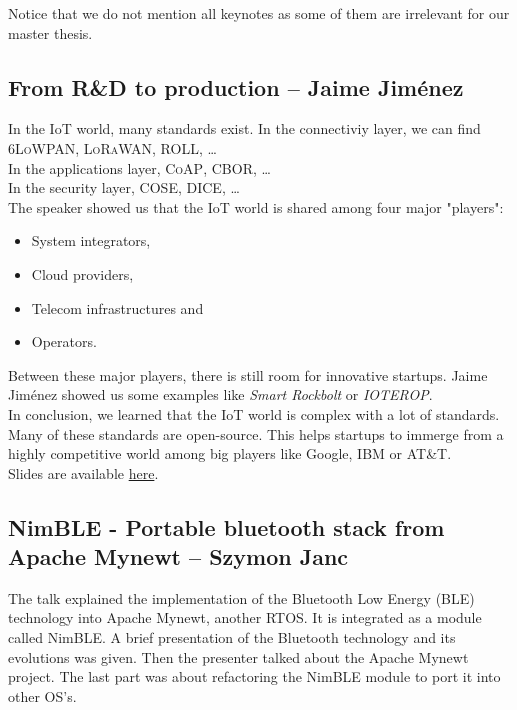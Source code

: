 \documentclass[journal, a4paper]{../IEEEtran}
\begin{document}
Notice that we do not mention all keynotes as some of them are irrelevant for our master thesis.

\subsection{From R\&D to production -- Jaime Jiménez}
In the IoT world, many standards exist. In the connectiviy layer, we can find \textsc{6LoWPAN}, \textsc{LoRaWAN}, \textsc{ROLL}, \dots \\
In the applications layer, \textsc{CoAP}, \textsc{CBOR}, \dots \\ 
In the security layer, \textsc{COSE}, \textsc{DICE}, \dots \\

The speaker showed us that the IoT world is shared among four major "players":
\begin{itemize}
    \item System integrators,
    \item Cloud providers,
    \item Telecom infrastructures and
    \item Operators.
\end{itemize}

Between these major players, there is still room for innovative startups. Jaime Jiménez showed us some examples like \textit{Smart Rockbolt} or \textit{IOTEROP}. \\

In conclusion, we learned that the IoT world is complex with a lot of standards. 
Many of these standards are open-source.
This helps startups to immerge from a highly competitive world among big players like Google, IBM or AT\&T. \\

Slides are available \href{http://summit.riot-os.org/2018/wp-content/uploads/sites/10/2018/09/0_3-Jaime-Jimenez-Keynote.pdf}{here}.

\subsection{NimBLE - Portable bluetooth stack from Apache Mynewt -- Szymon Janc}

The talk explained the implementation of the Bluetooth Low Energy (BLE) technology into Apache Mynewt, another RTOS.
It is integrated as a module called NimBLE.
A brief presentation of the Bluetooth technology and its evolutions was given.
Then the presenter talked about the Apache Mynewt project.
The last part was about refactoring the NimBLE module to port it into other OS's.\\
\end{document}
